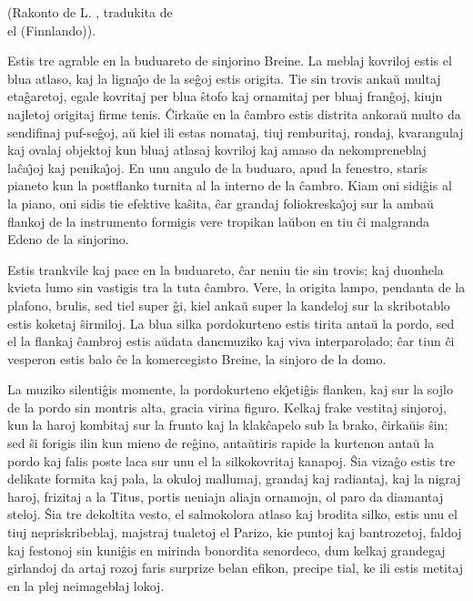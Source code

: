 \begin{center}
\footnotesize (Rakonto de L. , tradukita de \\  el  (Finnlando)).
\end{center}

   Estis tre agrable en la buduareto de sinjorino Breine. La meblaj
kovriloj estis el blua atlaso, kaj la ligna\^{\j}o de la se\^goj
estis origita. Tie sin trovis anka\u u multaj eta\^garetoj, egale
kovritaj per blua \^stofo kaj ornamitaj per bluaj fran\^goj, kiujn
najletoj origitaj firme tenis. \^Cirka\u ue en la \^cambro estis
distrita ankora\u u multo da sendifinaj puf-se\^goj, a\u u kiel ili
estas nomataj, tiuj remburitaj, rondaj, kvarangulaj kaj ovalaj
objektoj kun bluaj atlasaj kovriloj kaj amaso da nekompreneblaj
la\^ca\^{\j}oj kaj penika\^{\j}oj. En unu angulo de la buduaro, apud
la fenestro, staris pianeto kun la postflanko turnita al la interno
de la \^cambro. Kiam oni sidi\^gis al la piano, oni sidis tie
efektive ka\^sita, \^car grandaj foliokreska\^{\j}oj sur la amba\u u
flankoj de la instrumento formigis vere tropikan la\u ubon en tiu
\^ci malgranda Edeno de la sinjorino.

   Estis trankvile kaj pace en la buduareto, \^car neniu tie sin trovis;
kaj duonhela kvieta lumo sin vastigis tra la tuta \^cambro. Vere, la
origita lampo, pendanta de la plafono, brulis, sed tiel super \^gi,
kiel anka\u u super la kandeloj sur la skribotablo estis koketaj
\^sirmiloj. La blua silka pordokurteno estis tirita anta\u u la
pordo, sed el la flankaj \^cambroj estis a\u udata dancmuziko kaj
viva interparolado; \^car tiun \^ci vesperon estis balo \^ce la
komercegisto Breine, la sinjoro de la domo.

   La muziko silenti\^gis momente, la pordokurteno ek\^{\j}eti\^gis flanken,
kaj sur la sojlo de la pordo sin montris alta, gracia virina figuro.
Kelkaj frake vestitaj sinjoroj, kun la haroj kombitaj sur la frunto
kaj la klak\^capelo sub la brako, \^cirka\u uis \^sin; sed \^si
forigis ilin kun mieno de re\^gino, anta\u utiris rapide la kurtenon
anta\u u la pordo kaj falis poste laca sur unu el la silkokovritaj
kanapoj. \^Sia viza\^go estis tre delikate formita kaj pala, la
okuloj mallumaj, grandaj kaj radiantaj, kaj la nigraj haroj,
frizitaj a la Titus, portis neniajn aliajn ornamojn, ol paro da
diamantaj steloj. \^Sia tre dekoltita vesto, el salmokolora atlaso
kaj brodita silko, estis unu el tiuj nepriskribeblaj, majstraj
tualetoj el Parizo, kie puntoj kaj bantrozetoj, faldoj kaj festonoj
sin kuni\^gis en mirinda bonordita senordeco, dum kelkaj grandegaj
girlandoj da artaj rozoj faris surprize belan efikon, precipe tial,
ke ili estis metitaj en la plej neimageblaj lokoj.

